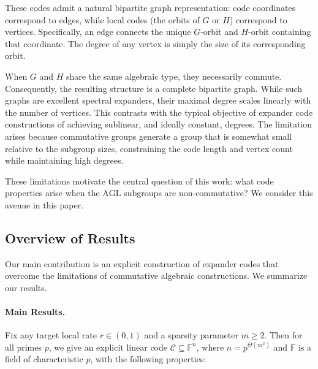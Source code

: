 \documentclass[11pt]{article}
\theoremstyle{plain}
\theoremstyle{definition}
\newcommand{\F}{\mathbb{F}}
\begin{document}
These codes admit a natural bipartite graph representation: code coordinates correspond to edges, while local codes (the orbits of $G$ or $H$) correspond to vertices. Specifically, an edge connects the unique $G$-orbit and $H$-orbit containing that coordinate. The degree of any vertex is simply the size of its corresponding orbit.

When $G$ and $H$ share the same algebraic type, they necessarily commute. Consequently, the resulting structure is a complete bipartite graph. While such graphs are excellent spectral expanders, their maximal degree scales linearly with the number of vertices. This contrasts with the typical objective of expander code constructions of achieving sublinear, and ideally constant, degrees. The limitation arises because commutative groups generate a group that is somewhat small relative to the subgroup sizes, constraining the code length and vertex count while maintaining high degrees.

These limitations motivate the central question of this work: what code properties arise when the $\mathrm{AGL}$ subgroups are non-commutative? We consider this avenue in this paper.

\subsection{Overview of Results}
\label{sec:overview}

Our main contribution is an explicit construction of expander codes that overcome the limitations of commutative algebraic constructions. We summarize our results.

\paragraph{Main Results.}
Fix any target local rate $r\in(0,1)$ and a sparsity parameter $m\ge 2$. 
Then for all primes $p$, we give an explicit linear code $\mathcal{C} \subseteq \F^n$,
where $n = p^{\Theta(m^2)}$ and $\F$ is a field of characteristic $p$, with the following properties:
\end{document}
